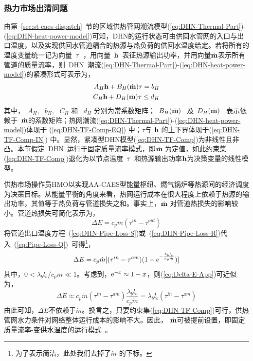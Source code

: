 \subsubsection{热力市场出清问题}

由第~\ref{sec:st-caes-dispatch}~节的区域供热管网潮流模型(\ref{eq:DHN-Thermal-Part})-(\ref{eq:DHN-heat-power-model})可知，DHN的运行状态可由供回水管网的入口与出口温度，以及实现供回水管道耦合的热源与热负荷的供回水温度给定。若将所有的温度变量统一记为向量~$\rm \tau$~，用向量~$\bf h$~表征热源输出功率，并用向量$\dot {\bf m}$表示所有管道的质量流率，则~DHN~潮流(\ref{eq:DHN-Thermal-Part})-(\ref{eq:DHN-heat-power-model})的紧凑形式可表示为，
\begin{subequations}
\label{eq:DHN-TF-Comp}
\begin{align}
A_H{\bf h} + B_H(\dot {\bf m})\tau = b_H\label{eq:DHN-TF-Comp-EQ}\\
C_H{\bf h} + D_H(\dot {\bf m})\tau \le d_H \label{eq:DHN-TF-Comp-IN}
\end{align}
\end{subequations}
其中，~$A_H$, ~$b_H$, ~$C_H$ 和 ~$d_H$ 分别为常系数矩阵；~$B_H(\dot {\bf m})$~ 及~$D_H(\dot {\bf m})$~ 表示依赖于~$\dot {\bf m}$的系数矩阵；热网潮流(\ref{eq:DHN-Thermal-Part})-(\ref{eq:DHN-heat-power-model})体现于 (\ref{eq:DHN-TF-Comp-EQ}) 中；$\tau$与 $\bf h$ 的上下界体现于(\ref{eq:DHN-TF-Comp-IN}) 中。显然，紧凑型DHN模型(\ref{eq:DHN-TF-Comp})为非线性且非凸。本节假定~DHN~运行于固定质量流率模式，即$\dot {\bf m}$ 为定值，如此约束集(\ref{eq:DHN-TF-Comp})退化为以节点温度~$\rm \tau$~和热源输出功率${\bf h}$为决策变量的线性模型。

供热市场操作员HMO以实现AA-CAES型能量枢纽、燃气锅炉等热源间的经济调度为决策目标。从能量平衡的角度来看，热网运行成本在很大程度上依赖于热源的输出功率，其值等于热负荷与管道损失之和。事实上，$\dot {\bf m}$ 对管道热损失的影响较小。管道热损失可简化表示为，
\begin{equation}
\label{eq:Pipe-Loss-Q}
\Delta E = c_p \dot m (\tau^{in}-\tau^{out})
\end{equation}
将管道出口温度方程~(\ref{eq:DHN-Pipe-Loss-S})或~(\ref{eq:DHN-Pipe-Loss-R})代入~(\ref{eq:Pipe-Loss-Q})~可得\footnote{为了表示简洁，此处我们去掉了$\dot m$ 的下标。}，
\begin{equation}
\label{eq:Delta-E-App}
\Delta E = c_p \dot m [ (\tau^{in}- \tau^{am})(1-{\rm e}^{-\frac{\lambda_b l_b}{c_p \dot m}})]
\end{equation}
其中，$0 < \lambda_b l_b/c_p \dot m \ll 1$。考虑到，${\rm e}^{-x} \approx 1-x$，则(\ref{eq:Delta-E-App})可近似为，
\begin{equation}
\Delta E \approx c_p \dot m (\tau^{in}-\tau^{am}) \frac{\lambda_b l_b}{c_p \dot m} = \lambda_b l_b(\tau^{in} - \tau^{am})
\end{equation}
由此可知，$\Delta E$不依赖于$\dot m$。换言之，只要约束集(\ref{eq:DHN-TF-Comp})可行，供热管网水力条件对网络整体运行成本的影响不大。因此， $\dot {\bf m}$可被提前设置，即固定质量流率-变供水温度的运行模式~\cite{DHN-CFVT-2013}。


